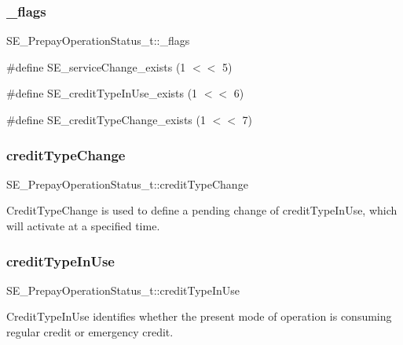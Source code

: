 \subsubsection{\texorpdfstring{\+\_\+flags}{\_flags}}
{\footnotesize\ttfamily S\+E\+\_\+\+Prepay\+Operation\+Status\+\_\+t\+::\+\_\+flags}

\#define S\+E\+\_\+service\+Change\+\_\+exists (1 $<$$<$ 5)

\#define S\+E\+\_\+credit\+Type\+In\+Use\+\_\+exists (1 $<$$<$ 6)

\#define S\+E\+\_\+credit\+Type\+Change\+\_\+exists (1 $<$$<$ 7) \mbox{\label{group__PrepayOperationStatus_ga585930db1ced44829ce2699542c605da}} 
\subsubsection{\texorpdfstring{credit\+Type\+Change}{creditTypeChange}}
{\footnotesize\ttfamily S\+E\+\_\+\+Prepay\+Operation\+Status\+\_\+t\+::credit\+Type\+Change}

Credit\+Type\+Change is used to define a pending change of credit\+Type\+In\+Use, which will activate at a specified time. \mbox{\label{group__PrepayOperationStatus_ga931c94832d59d1ab3b0940fcf20bb956}} 
\subsubsection{\texorpdfstring{credit\+Type\+In\+Use}{creditTypeInUse}}
{\footnotesize\ttfamily S\+E\+\_\+\+Prepay\+Operation\+Status\+\_\+t\+::credit\+Type\+In\+Use}

Credit\+Type\+In\+Use identifies whether the present mode of operation is consuming regular credit or emergency credit. \mbox{\label{group__PrepayOperationStatus_ga4111baa24c3cf308caa4879263d9354e}} 
